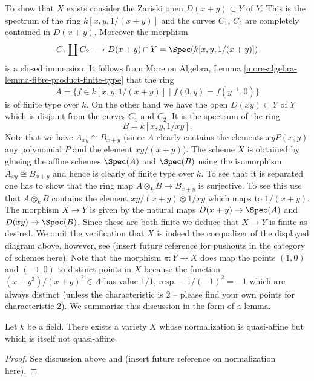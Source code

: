 \medskip\noindent
To show that $X$ exists consider the Zariski open
$D(x + y) \subset Y$ of $Y$. This is the spectrum
of the ring
$k[x, y, 1/(x + y)]$
and the curves $C_1$, $C_2$ are completely contained in
$D(x + y)$. Moreover the morphism
$$
C_1 \coprod C_2
\longrightarrow
D(x + y) \cap Y = \Spec(k[x, y, 1/(x + y)])
$$
is a closed immersion. It follows from
More on Algebra, Lemma \ref{more-algebra-lemma-fibre-product-finite-type}
that the ring
$$
A =
\{f \in k[x, y, 1/(x + y)] \mid f(0, y) = f(y^{-1}, 0)\}
$$
is of finite type over $k$. On the other hand we have the open
$D(xy) \subset Y$ of $Y$ which is disjoint from the curves $C_1$
and $C_2$. It is the spectrum of the ring
$$
B = k[x, y, 1/xy].
$$
Note that we have $A_{xy} \cong B_{x + y}$ (since $A$ clearly contains
the elements $xyP(x, y)$ any polynomial $P$ and the element $xy/(x + y)$).
The scheme $X$ is obtained by glueing the affine schemes
$\Spec(A)$ and $\Spec(B)$ using the isomorphism
$A_{xy} \cong B_{x + y}$ and hence is clearly of finite type over
$k$. To see that it is separated one has to show that the
ring map $A \otimes_k B \to B_{x + y}$ is surjective. To see
this use that $A \otimes_k B$ contains the element
$xy/(x + y) \otimes 1/xy$ which maps to $1/(x + y)$.
The morphism $X \to Y$ is given by the natural maps
$D(x + y) \to \Spec(A)$ and $D(xy) \to \Spec(B)$.
Since these are both finite we deduce that $X \to Y$ is finite
as desired. We omit the verification that $X$ is indeed the
coequalizer of the displayed diagram above, however, see
(insert future reference for pushouts in the category of schemes
here). Note that the morphism $\pi : Y \to X$ does
map the points  $(1, 0)$
and $(-1, 0)$ to distinct points in $X$ because the
function $(x + y^3)/(x + y)^2 \in A$ has value
$1/1$, resp.\ $-1/(-1)^2 = -1$ which are always distinct
(unless the characteristic is $2$ -- please find your own points
for characteristic $2$). We summarize this discussion in the
form of a lemma.

\begin{lemma}
\label{lemma-quasi-affine-normalization-not-quasi-affine}
Let $k$ be a field.
There exists a variety $X$ whose normalization is quasi-affine but
which is itself not quasi-affine.
\end{lemma}

\begin{proof}
See discussion above and (insert future reference on normalization here).
\end{proof}






